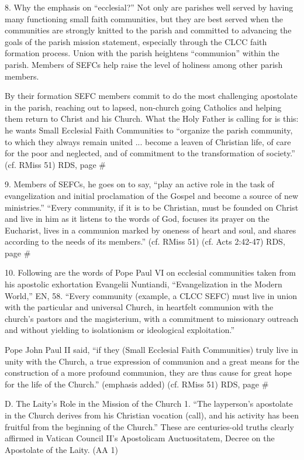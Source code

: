 \documentclass[oneside]{book}
\begin{document}
8. Why the emphasis on ``ecclesial?'' Not only are parishes well served by
having many functioning small faith communities, but they are best served when
the communities are strongly knitted to the parish and committed to advancing
the goals of the parish mission statement, especially through the CLCC faith
formation process. Union with the parish heightens ``communion'' within the
parish. Members of SEFCs help raise the level of holiness among other parish
members.

By their formation SEFC members commit to do the most challenging apostolate in
the parish, reaching out to lapsed, non-church going Catholics and helping them
return to Christ and his Church. What the Holy Father is calling for is this: he
wants Small Ecclesial Faith Communities to ``organize the parish community, to
which they always remain united ... become a leaven of Christian life, of care
for the poor and neglected, and of commitment to the transformation of
society.'' (cf. RMiss 51)
RDS, page \#

9. Members of SEFCs, he goes on to say, ``play an active role in the task of
evangelization and initial proclamation of the Gospel and become a source of new
ministries.'' ``Every community, if it is to be Christian, must be founded on
Christ and live in him as it listens to the words of God, focuses its prayer on
the Eucharist, lives in a communion marked by oneness of heart and soul, and
shares according to the needs of its members.'' (cf. RMiss 51) (cf. Acts
2:42-47)
RDS, page \#

10. Following are the words of Pope Paul VI on ecclesial communities taken from
his apostolic exhortation Evangelii Nuntiandi, ``Evangelization in the Modern
World,'' EN, 58. ``Every community (example, a CLCC SEFC) must live in union
with the particular and universal Church, in heartfelt communion with the
church's pastors and the magisterium, with a commitment to missionary outreach
and without yielding to isolationism or ideological exploitation.''

Pope John Paul II said, ``if they (Small Ecclesial Faith Communities) truly live
in unity with the Church, a true expression of communion and a great means for
the construction of a more profound communion, they are thus cause for great
hope for the life of the Church.'' (emphasis added) (cf. RMiss 51)
RDS, page \#

D. The Laity's Role in the Mission of the Church
1. ``The layperson's apostolate in the Church derives from his Christian
vocation (call), and his activity has been fruitful from the beginning of the
Church.'' These are centuries-old truths clearly affirmed in Vatican Council
II's Apostolicam Auctuositatem, Decree on the Apostolate of the Laity. (AA 1)
\end{document}
